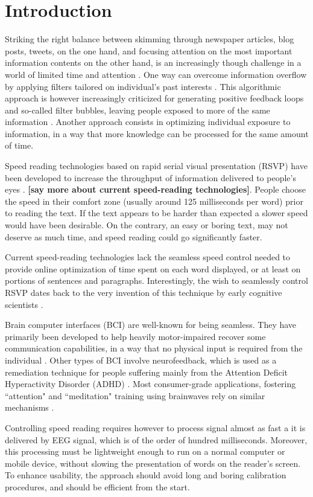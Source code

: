 \section{Introduction}
Striking the right balance between skimming through newspaper articles, blog posts, tweets, on the one hand, and focusing attention on the most important information contents on the other hand, is an increasingly though challenge in a world of limited time \cite{maillart2011} and attention \cite{anham2006economics}. One way can overcome information overflow by applying filters tailored on individual's past interests \cite{}. This algorithmic approach is however increasingly criticized for generating positive feedback loops and so-called filter bubbles, leaving people exposed to more of the same information \cite{}. Another approach consists in optimizing individual exposure to information, in a way that more knowledge can be processed for the same amount of time.

Speed reading technologies based on rapid serial visual presentation (RSVP) have been developed to increase the throughput of information delivered to people's eyes \cite{slate2014}. {\bf [say more about current speed-reading technologies]}. People choose the speed in their comfort zone (usually around 125 milliseconds per word) prior to reading the text. If the text appears to be harder than expected a slower speed would have been desirable. On the contrary, an easy or boring text, may not deserve as much time, and speed reading could go significantly faster.

Current speed-reading technologies lack the seamless speed control needed to provide online optimization of time spent on each word displayed, or at least on portions of sentences and paragraphs. Interestingly, the wish to seamlessly control RSVP dates back to the very invention of this technique by early cognitive scientists \cite{}.

Brain computer interfaces (BCI) are well-known for being seamless. They have primarily been developed to help heavily motor-impaired recover some communication capabilities, in a way that no physical input is required from the individual \cite{}. Other types of BCI involve neurofeedback, which is used as a remediation technique for people suffering mainly from the Attention Deficit Hyperactivity Disorder (ADHD) \cite{}. Most consumer-grade applications, fostering ``attention" and ``meditation" training using brainwaves rely on similar mechanisms \cite{}.

Controlling speed reading requires however to process signal almost as fast a it is delivered by EEG signal, which is of the order of hundred milliseconds. Moreover, this processing must be lightweight enough to run on a normal computer or mobile device, without slowing the presentation of words on the reader's screen. To enhance usability, the approach should avoid long and boring calibration procedures, and should be efficient from the start.

